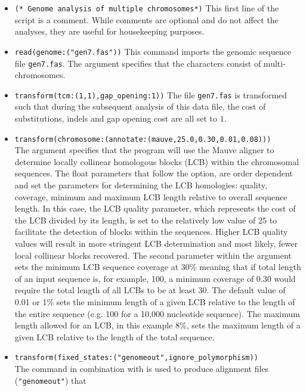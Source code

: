 \begin{itemize}
\item \texttt{(* Genome analysis of multiple chromosomes*)} This first line of the script is a comment. While 
comments are optional and do not affect the analyses, they are useful for housekeeping purposes.
\item \texttt{read(genome:("gen7.fas"))} This command imports the genomic sequence file \texttt{gen7.fas}. The 
argument  specifies that the characters consist of multi-chromosomes. 
\item \texttt{transform(tcm:(1,1),gap\_opening:1))} The file \texttt{gen7.fas} is transformed such that during the 
subsequent analysis of this data file, the cost of substitutions, indels and gap opening cost are all set to $1$.
\item \texttt{transform(chromosome:(annotate:(mauve,25.0,0.30,0.01,0.08)))} \\The argument 
 specifies that the program will use the Mauve aligner \cite{darlingetal2004} 
to determine locally collinear homologous blocks (LCB) within the chromosomal sequences.  The float parameters 
that follow the  option, are order dependent and set the parameters for determining the LCB 
homologies: quality, coverage, minimum and maximum LCB length relative to overall sequence length. In this case, 
the LCB quality parameter, which represents the cost of the LCB divided by its length,
 is set to the relatively low value of 25 to facilitate the detection of blocks within the sequences.  Higher LCB 
 quality values will result in more stringent LCB determination and most likely, fewer local collinear blocks recovered.  The 
 second parameter within the argument  sets the minimum LCB sequence coverage 
 at  30\% meaning that if total length of an input sequence is, for example, 100, a minimum coverage of 0.30 would 
 require  the total length of all LCBs to be at least 30. The default value of 0.01 or 1\% sets the minimum length of a 
 given LCB  relative to the length of the entire sequence (e.g. 100 for a 10,000 nucleotide sequence). The maximum 
 length allowed for an LCB, in this example 8\%, sets the maximum length of a given LCB relative to the length of 
 the total sequence.
\item \texttt{transform(fixed\_states:("genomeout",ignore\_polymorphism))}  \\The {} command 
in combination with  is used to produce alignment files  (\texttt{"genomeout"}) that 

\end{itemize}
